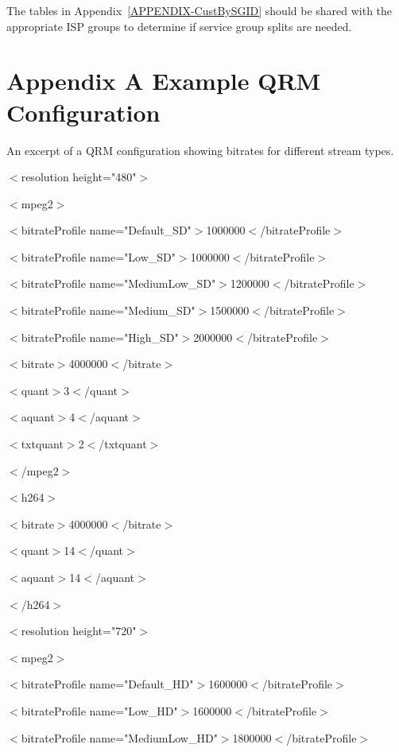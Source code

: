 \documentclass{article}
\begin{document}
The tables in Appendix~\ref{APPENDIX-CustBySGID} should be shared with the appropriate ISP groups to determine if service group splits are needed. 



\newpage

\appendix

\section{Appendix A\: Example QRM Configuration}
\label{APPENDIX-QRMConfig}

An excerpt of a QRM configuration showing bitrates for different stream types.  
\newline
\newline

$<$resolution height="480"$>$

$<$mpeg2$>$

$<$bitrateProfile name="Default\_SD"$>$1000000$<$/bitrateProfile$>$

$<$bitrateProfile name="Low\_SD"$>$1000000$<$/bitrateProfile$>$

$<$bitrateProfile name="MediumLow\_SD"$>$1200000$<$/bitrateProfile$>$

$<$bitrateProfile name="Medium\_SD"$>$1500000$<$/bitrateProfile$>$

$<$bitrateProfile name="High\_SD"$>$2000000$<$/bitrateProfile$>$

$<$bitrate$>$4000000$<$/bitrate$>$

$<$quant$>$3$<$/quant$>$

$<$aquant$>$4$<$/aquant$>$

$<$txtquant$>$2$<$/txtquant$>$

$<$/mpeg2$>$

$<$h264$>$

$<$bitrate$>$4000000$<$/bitrate$>$

$<$quant$>$14$<$/quant$>$

$<$aquant$>$14$<$/aquant$>$

$<$/h264$>$
\newline
\newline

$<$resolution height="720"$>$

$<$mpeg2$>$

$<$bitrateProfile name="Default\_HD"$>$1600000$<$/bitrateProfile$>$

$<$bitrateProfile name="Low\_HD"$>$1600000$<$/bitrateProfile$>$

$<$bitrateProfile name="MediumLow\_HD"$>$1800000$<$/bitrateProfile$>$
\end{document}
